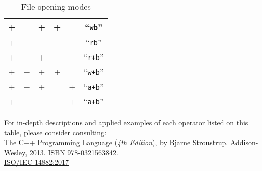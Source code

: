 \documentclass[letter]{article}
\begin{document}
\begin{table}[!h]
\begin{tabular}{|cccccc|}
+          &        & +      & +        &        & ``\texttt{wb}''                                  \\ \hline
+          & +      &        &          &        & ``\texttt{rb}''                                  \\ \hline
+          & +      & +      &          &        & ``\texttt{r+b}''                                 \\ \hline
+          & +      & +      & +        &        & ``\texttt{w+b}''                                 \\ \hline
+          & +      & +      &          & +      & ``\texttt{a+b}''                                 \\ \hline
+          & +      &        &          & +      & ``\texttt{a+b}''                                 \\ \hline
\hline
\end{tabular}
\caption{File opening modes}
\end{table}

\noindent
For in-depth descriptions and applied examples of each operator listed on
this table, please consider consulting: \\

\noindent
The C++ Programming Language ({\it{4th Edition}}), by Bjarne Stroustrup.
Addison-Wesley, 2013. ISBN 978-0321563842.\\

\noindent
\href{https://www.iso.org/standard/68564.html}{ISO/IEC 14882:2017}
\end{document}
